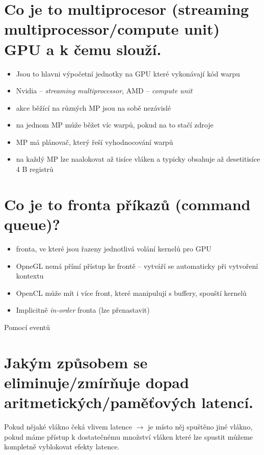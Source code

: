 \section{Co je to multiprocesor (streaming multiprocessor/compute unit) GPU a k čemu slouží.}
	\begin{itemize}
		\setlength\itemsep{0em}
		\item Jsou to hlavni výpočetní jednotky na GPU které vykonávají kód warpu
		\item Nvidia -- \emph{streaming multiprocessor}, AMD -- \emph{compute unit}
		\item akce běžící na různých MP jsou na sobě nezávislé
		\item na jednom MP může běžet víc warpů, pokud na to stačí zdroje
		\item MP má plánovač, který řeší vyhodnocování warpů
		\item na každý MP lze naalokovat až tisíce vláken a typicky obsahuje až desetitisíce 4 B registrů
	\end{itemize}


\section{Co je to fronta příkazů (command queue)?}
	\begin{itemize}
		\setlength\itemsep{0em}
		\item fronta, ve které jsou řazeny jednotlivá volání kernelů pro GPU
		\item OpneGL nemá přímí přístup ke frontě -- vytváří se automaticky při vytvoření kontextu
		\item OpenCL může mít i více front, které manipulují s buffery, spouští kernelů
		\item Implicitně \emph{in-order} fronta (lze přenastavit)
	\end{itemize}


	Pomocí eventů


\section{Jakým způsobem se eliminuje/zmírňuje dopad aritmetických/paměťových latencí.}
	Pokud nějaké vlákno čeká vlivem latence $\rightarrow$ je místo něj spuštěno jiné vlákno, pokud máme přístup k dostatečnému množství vláken které lze spustit můžeme kompletně vyblokovat efekty latence.


